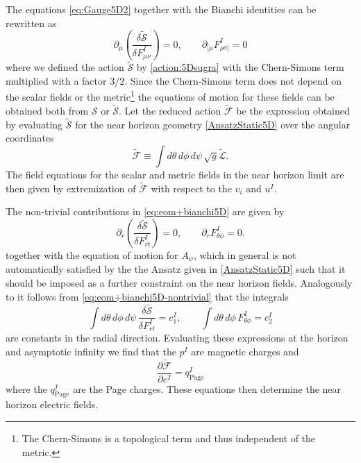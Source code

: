 \documentclass[12pt,twoside]{book}
\begin{document}
\begin{appendices}
The equations \eqref{eq:Gauge5D2} together with the Bianchi identities can be rewritten as
\begin{equation}\label{eq:eom+bianchi5D}
\partial_{\mu}\left(\frac{\delta \tilde{\mathcal{S}}}{\delta F^{I}_{\mu\nu}}\right)=0,\qquad \partial_{[\mu}F^{I}_{\rho\sigma]}=0
\end{equation}
where we defined the action $\tilde{\mathcal{S}}$ by \eqref{action:5Dsugra} with the Chern-Simons term multiplied with a factor $3/2$. Since the Chern-Simons term does not depend on the scalar fields or the metric\footnote{The Chern-Simons is a topological term and thus independent of the metric.} the equations of motion for these fields can be obtained both from $\mathcal{S}$ or $\tilde{\mathcal{S}}$. Let the reduced action $\tilde{\mathcal{F}}$ be the expression obtained by evaluating $\tilde{\mathcal{S}}$ for the near horizon geometry \eqref{AnsatzStatic5D} over the angular coordinates \cite{Sen:2005kx}
\begin{equation}\label{reducedLagrangianTilde}
\tilde{\mathcal{F}} \equiv \int d\theta\, d\phi\, d\psi\, \sqrt{g}\tilde{\mathcal{L}}.
\end{equation}The field equations for the scalar and metric fields in the near horizon limit are then given by extremization of $\tilde{\mathcal{F}}$ with respect to the $v_{i}$ and $u^{I}$.

The non-trivial contributions in \eqref{eq:eom+bianchi5D} are given by
\begin{equation}\label{eq:eom+bianchi5D-nontrivial}
\partial_{r}\left(\frac{\delta \tilde{\mathcal{S}}}{\delta F^{I}_{rt}}\right)=0,\qquad \partial_{r}F^{I}_{\theta\phi}=0.
\end{equation}
together with the equation of motion for $A_{\psi}$, which in general is not automatically satisfied by the the Ansatz given in \eqref{AnsatzStatic5D} such that it should be imposed as a further constraint on the near horizon fields.
Analogously to \cite{Sen:2005kx} it follows from \eqref{eq:eom+bianchi5D-nontrivial} that the integrals
\begin{equation}
\int d\theta\, d\phi\, d\psi\, \frac{\delta\tilde{\mathcal{S}}}{\delta F^{I}_{rt}}=c_{1}^{I},\qquad
\int d\theta\, d\phi\, F^{I}_{\theta\phi}=c_{2}^{I}
\end{equation}
are constants in the radial direction. Evaluating these expressions at the horizon and asymptotic infinity we find that the $p^{I}$ are magnetic charges and
\begin{equation}\label{Page-charge-5D}
\frac{\partial \tilde{\mathcal{F}}}{\partial e^{I}} = q^{I}_{\mathrm{Page}}
\end{equation}
where the $q^{I}_{\mathrm{Page}}$ are the Page charges. These equations then determine the near horizon electric fields.\\


\end{appendices}
\end{document}
